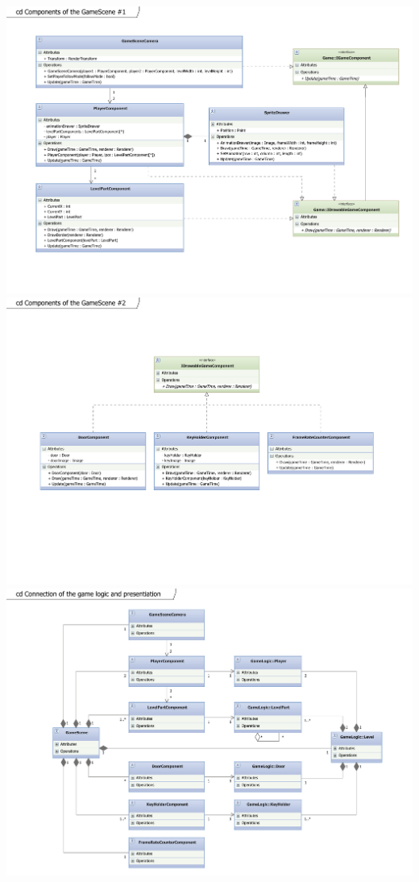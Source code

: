 \begin{center}
\includegraphics[scale=0.7,angle=90]{GameSceneComponents.pdf}
\newpage
\includegraphics[scale=0.7,angle=90]{GameSceneComponents2.pdf}
\newpage
\includegraphics[scale=0.7,angle=90]{GameLogicPresentationConnection.pdf}
\newpage
\end{center}

